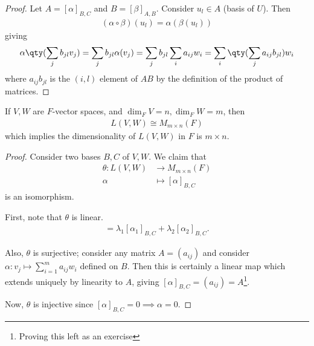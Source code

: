 \begin{proof}
    Let $A = [\alpha]_{B, C}$ and $B = [\beta]_{A, B}$.
    Consider $u_l \in A$ (basis of $U$).
    Then
    \begin{align*}
        (\alpha \circ \beta)(u_l) = \alpha(\beta(u_l))
    \end{align*}
    giving
    \begin{align*}
        \alpha\qty(\sum_j b_{jl} v_j) = \sum_j b_{jl} \alpha(v_j) = \sum_j b_{jl} \sum_i a_{ij} w_i = \sum_i \qty( \sum_j a_{ij} b_{jl} ) w_i
    \end{align*}
    where $a_{ij} b_{jl}$ is the $(i, l)$ element of $AB$ by the definition of the product of matrices.
\end{proof}
\begin{proposition} \label{prp:dimmapspace}
    If $V, W$ are $F$-vector spaces, and $\dim_F V = n, \dim_F W = m$, then
    \begin{align*}
        L(V,W) \cong M_{m \times n}(F)
    \end{align*}
    which implies the dimensionality of $L(V,W)$ in $F$ is $m \times n$.
\end{proposition}
\begin{proof}
    Consider two bases $B, C$ of $V, W$.
    We claim that
    \begin{align*}
        \theta \colon L(V,W) &\to M_{m \times n}(F) \\
        \alpha &\mapsto [\alpha]_{B, C}
    \end{align*}
    is an isomorphism.

    First, note that $\theta$ is linear.
    \begin{align*}
        [\lambda_1 \alpha_1 + \lambda_2 \alpha_2] = \lambda_1 [\alpha_1]_{B, C} + \lambda_2 [\alpha_2]_{B, C}.
    \end{align*} 

    Also, $\theta$ is surjective; consider any matrix $A = (a_{ij})$ and consider $\alpha \colon v_j \mapsto \sum_{i=1}^m a_{ij} w_i$ defined on $B$.
    Then this is certainly a linear map which extends uniquely by linearity to $A$, giving $[\alpha]_{B,C} = (a_{ij}) = A$\footnote{Proving this left as an exercise}.

    Now, $\theta$ is injective since $[\alpha]_{B,C} = 0 \implies \alpha = 0$.
\end{proof}
